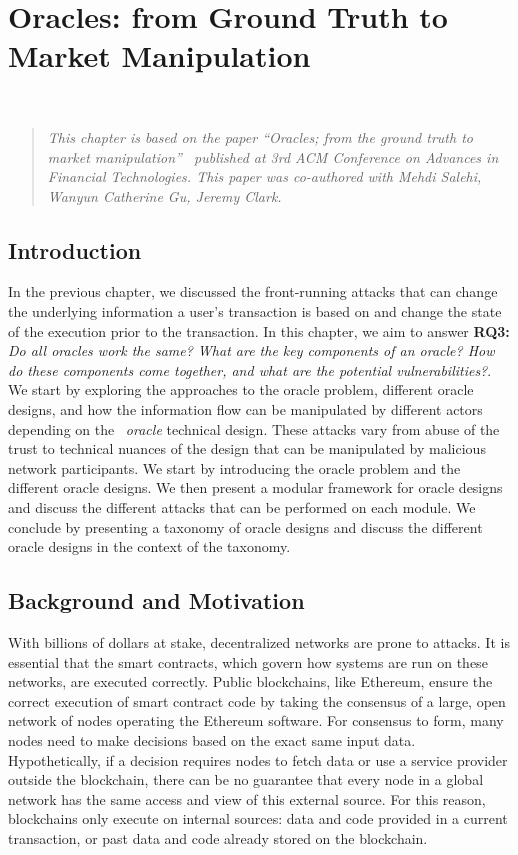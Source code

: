 \chapter{Oracles: from Ground Truth to Market Manipulation} ~\label{sec:oracles}

\begin{quote}
	\textit{This chapter is based on the paper ``Oracles; from the ground truth to market manipulation''~\cite{eskandari2021sok} published at 3rd ACM Conference on Advances in Financial Technologies. This paper was co-authored with Mehdi Salehi, Wanyun Catherine Gu, Jeremy Clark.}
\end{quote}

\section{Introduction}

In the previous chapter, we discussed the front-running attacks that can change the underlying information a user's transaction is based on and change the state of the execution prior to the transaction. In this chapter, we aim to answer \textbf{RQ3:} \textit{Do all oracles work the same? What are the key components of an oracle? How do these components come together, and what are the potential vulnerabilities?}. We start by exploring the approaches to the oracle problem, different oracle designs, and how the information flow can be manipulated by different actors depending on the ~\textit{oracle} technical design. These attacks vary from abuse of the trust to technical nuances of the design that can be manipulated by malicious network participants. We start by introducing the oracle problem and the different oracle designs. We then present a modular framework for oracle designs and discuss the different attacks that can be performed on each module. We conclude by presenting a taxonomy of oracle designs and discuss the different oracle designs in the context of the taxonomy. 


\section{Background and Motivation}

With billions of dollars at stake, decentralized networks are prone to attacks. It is essential that the smart contracts, which govern how systems are run on these networks, are executed correctly. Public blockchains, like Ethereum, ensure the correct execution of smart contract code by taking the consensus of a large, open network of nodes operating the Ethereum software. For consensus to form, many nodes need to make decisions based on the exact same input data. Hypothetically, if a decision requires nodes to fetch data or use a service provider outside the blockchain, there can be no guarantee that every node in a global network has the same access and view of this external source. For this reason, blockchains only execute on internal sources: data and code provided in a current transaction, or past data and code already stored on the blockchain.


